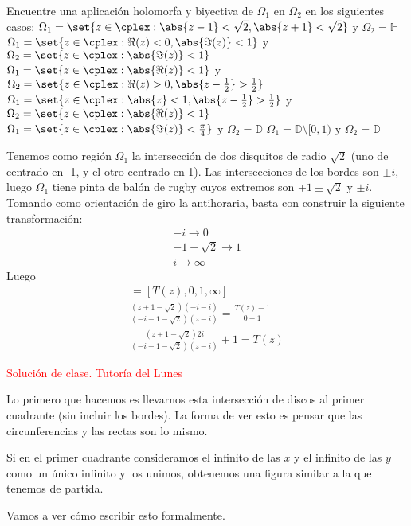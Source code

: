 \begin{problem}[10]
Encuentre una aplicación holomorfa y biyectiva de $\Omega_1$ en $\Omega_2$ en los siguientes casos:
\ppart $\Omega_{1} = \set{z \in \cplex: \abs{z-1} < \sqrt{2}, \abs{z+1} < \sqrt{2}}$ y $\Omega_{2} = \mathbb{H}$
\ppart $\Omega_{1} = \set{z \in \cplex: \Re(z) < 0, \abs{\Im(z)} < 1}$ y $\Omega_{2} = \set{z \in \cplex: \abs{\Im(z)} < 1}$
\ppart $\Omega_{1} = \set{z \in \cplex: \abs{\Re(z)} < 1}$ y $\Omega_{2} = \set{z \in \cplex: \Re(z) > 0, \abs{z - \frac{1}{2}} > \frac{1}{2}}$
\ppart $\Omega_{1} = \set{z \in \cplex: \abs{z} < 1, \abs{z - \frac{1}{2}} > \frac{1}{2}}$ y $\Omega_{2} = \set{z \in \cplex: \abs{\Re(z)} < 1}$
\ppart $\Omega_{1} = \set{z \in \cplex: \abs{\Im(z)} < \frac{\pi}{4}}$ y $\Omega_{2} = \mathbb{D}$
\ppart $\Omega_{1} = \mathbb{D}\setminus[0,1)$ y $\Omega_{2} = \mathbb{D}$
\solution

\spart {}

Tenemos como región $\Omega_1$ la intersección de dos disquitos de radio $\sqrt{2}$ (uno de centrado en -1, y el otro centrado en 1). Las intersecciones de los bordes son $\pm i$, luego $\Omega_1$ tiene pinta de balón de rugby cuyos extremos son $\mp 1 \pm \sqrt{2}$ y $\pm i$. Tomando como orientación de giro la antihoraria, basta con construir la siguiente transformación:
\begin{align*}
	-i \to 0\\
	-1+\sqrt{2} \to 1\\
	i \to \infty
\end{align*}
Luego
\begin{align*}
[z, -i, -1+\sqrt{2}, i] = [T(z), 0, 1, \infty]\\
\frac{(z + 1 - \sqrt{2}) (-i - i)}{(-i + 1 - \sqrt{2}) (z - i)} = \frac{T(z) - 1}{0 - 1}\\
\frac{(z + 1 - \sqrt{2}) 2i}{(-i + 1 - \sqrt{2}) (z - i)} + 1 = T(z)
\end{align*}

\textcolor{red}{Solución de clase. Tutoría del Lunes}

Lo primero que hacemos es llevarnos esta intersección de discos al primer cuadrante (sin incluir los bordes). La forma de ver esto es pensar que las circunferencias y las rectas son lo mismo.

Si en el primer cuadrante consideramos el infinito de las $x$ y el infinito de las $y$ como un único infinito y los unimos, obtenemos una figura similar a la que tenemos de partida.

Vamos a ver cómo escribir esto formalmente.


\end{problem}
